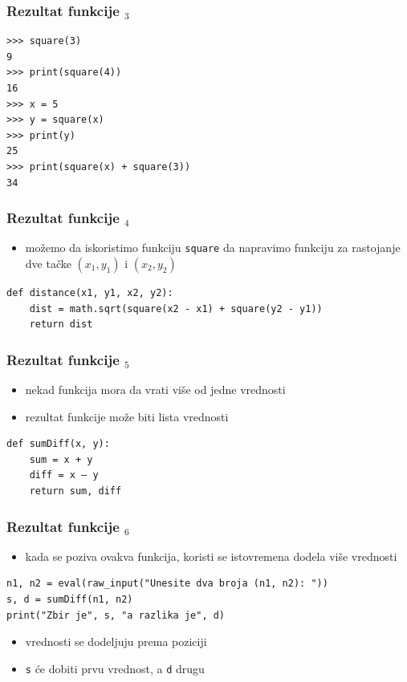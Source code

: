 \documentclass[utf8,compress]{beamer}
\begin{document}
\begin{frame}[fragile]
  \frametitle{Rezultat funkcije $_3$}
\begin{verbatim}
>>> square(3)
9
>>> print(square(4))
16
>>> x = 5
>>> y = square(x)
>>> print(y)
25
>>> print(square(x) + square(3))
34
\end{verbatim}
\end{frame}

\begin{frame}[fragile]
  \frametitle{Rezultat funkcije $_4$}
  \begin{itemize}
    \item možemo da iskoristimo funkciju \texttt{square} da napravimo funkciju za rastojanje dve tačke $(x_1,y_1)$ i $(x_2,y_2)$
  \end{itemize}
\begin{verbatim}
def distance(x1, y1, x2, y2):
    dist = math.sqrt(square(x2 - x1) + square(y2 - y1))
    return dist
\end{verbatim}
\end{frame}

\begin{frame}[fragile]
  \frametitle{Rezultat funkcije $_5$}
  \begin{itemize}
    \item nekad funkcija mora da vrati više od jedne vrednosti
    \item rezultat funkcije može biti lista vrednosti
  \end{itemize}
\begin{verbatim}
def sumDiff(x, y):
    sum = x + y
    diff = x – y
    return sum, diff
\end{verbatim}
\end{frame}

\begin{frame}[fragile,shrink=5]
  \frametitle{Rezultat funkcije $_6$}
  \begin{itemize}
    \item kada se poziva ovakva funkcija, koristi se istovremena dodela više vrednosti
  \end{itemize}
\begin{verbatim}
n1, n2 = eval(raw_input("Unesite dva broja (n1, n2): "))
s, d = sumDiff(n1, n2)
print("Zbir je", s, "a razlika je", d)
\end{verbatim}
  \begin{itemize}
    \item vrednosti se dodeljuju prema poziciji
    \item \texttt{s} će dobiti prvu vrednost, a \texttt{d} drugu
  \end{itemize}
\end{frame}
\end{document}
